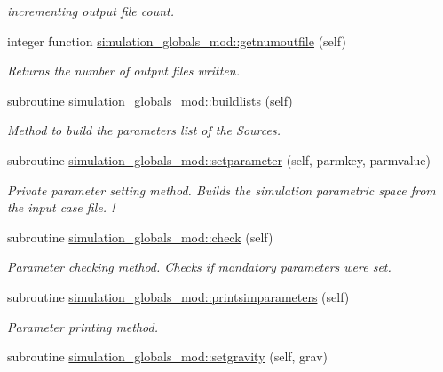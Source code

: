 \begin{DoxyCompactItemize}
\begin{DoxyCompactList}\small\item\em incrementing output file count. \end{DoxyCompactList}\item 
integer function \mbox{\hyperlink{namespacesimulation__globals__mod_a8114d54a4c7e4cf505b30d51f4bdccdd}{simulation\+\_\+globals\+\_\+mod\+::getnumoutfile}} (self)
\begin{DoxyCompactList}\small\item\em Returns the number of output files written. \end{DoxyCompactList}\item 
subroutine \mbox{\hyperlink{namespacesimulation__globals__mod_a7d1e2edffaed498051342e0cd902ce1c}{simulation\+\_\+globals\+\_\+mod\+::buildlists}} (self)
\begin{DoxyCompactList}\small\item\em Method to build the parameters list of the Sources. \end{DoxyCompactList}\item 
subroutine \mbox{\hyperlink{namespacesimulation__globals__mod_a8a05831d4c3e3eb5741d65978f6fcf61}{simulation\+\_\+globals\+\_\+mod\+::setparameter}} (self, parmkey, parmvalue)
\begin{DoxyCompactList}\small\item\em Private parameter setting method. Builds the simulation parametric space from the input case file. ! \end{DoxyCompactList}\item 
subroutine \mbox{\hyperlink{namespacesimulation__globals__mod_a41249abb5c33ef9e8bff448f0b3826fa}{simulation\+\_\+globals\+\_\+mod\+::check}} (self)
\begin{DoxyCompactList}\small\item\em Parameter checking method. Checks if mandatory parameters were set. \end{DoxyCompactList}\item 
subroutine \mbox{\hyperlink{namespacesimulation__globals__mod_a97c04d0289a9f2d004a9329cb7ab16f0}{simulation\+\_\+globals\+\_\+mod\+::printsimparameters}} (self)
\begin{DoxyCompactList}\small\item\em Parameter printing method. \end{DoxyCompactList}\item 
subroutine \mbox{\hyperlink{namespacesimulation__globals__mod_a9e92dfed4ef7388208adce768f064554}{simulation\+\_\+globals\+\_\+mod\+::setgravity}} (self, grav)

\end{DoxyCompactItemize}
